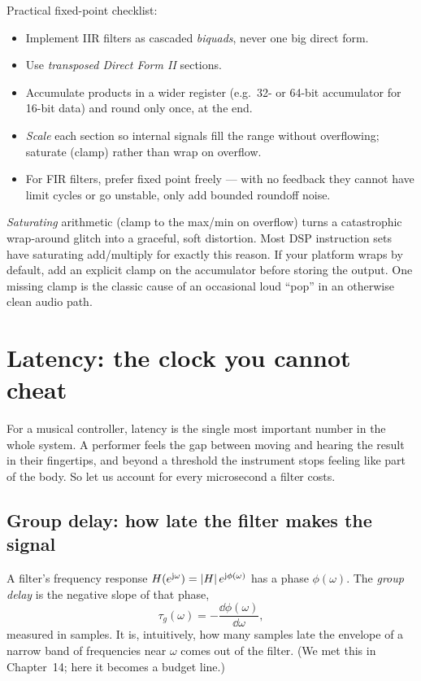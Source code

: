 \begin{focusbox}
Practical fixed-point checklist:
\begin{itemize}
  \item Implement IIR filters as cascaded \emph{biquads}, never one big direct
        form.
  \item Use \emph{transposed Direct Form II} sections.
  \item Accumulate products in a wider register (e.g.\ 32- or 64-bit accumulator
        for 16-bit data) and round only once, at the end.
  \item \emph{Scale} each section so internal signals fill the range without
        overflowing; saturate (clamp) rather than wrap on overflow.
  \item For FIR filters, prefer fixed point freely --- with no feedback they
        cannot have limit cycles or go unstable, only add bounded roundoff noise.
\end{itemize}
\end{focusbox}

\begin{trapbox}
\emph{Saturating} arithmetic (clamp to the max/min on overflow) turns a
catastrophic wrap-around glitch into a graceful, soft distortion. Most DSP
instruction sets have saturating add/multiply for exactly this reason. If your
platform wraps by default, add an explicit clamp on the accumulator before
storing the output. One missing clamp is the classic cause of an occasional loud
``pop'' in an otherwise clean audio path.
\end{trapbox}

\section{Latency: the clock you cannot cheat}
\label{ch17:latency}

For a musical controller, latency is the single most important number in the
whole system. A performer feels the gap between moving and hearing the result in
their fingertips, and beyond a threshold the instrument stops feeling like part
of the body. So let us account for every microsecond a filter costs.

\subsection{Group delay: how late the filter makes the signal}

A filter's frequency response $H(e^{\mathrm{j}\omega}) = \lvert H\rvert\,e^{\mathrm{j}\phi(\omega)}$
has a phase $\phi(\omega)$. The \emph{group delay} is the negative slope of that
phase,
\begin{equation}
  \tau_g(\omega) = -\frac{\dd \phi(\omega)}{\dd\omega},
  \label{ch17:groupdelay}
\end{equation}
measured in samples. It is, intuitively, how many samples late the envelope of a
narrow band of frequencies near $\omega$ comes out of the filter. (We met this in
Chapter~14; here it becomes a budget line.)

